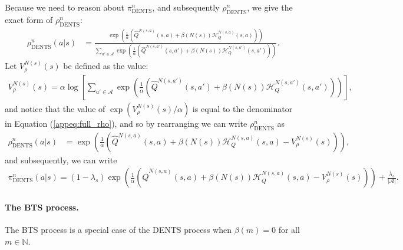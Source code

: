 \documentclass{article}
\newcommand{\bb}[1]{\mathbb{#1}}
\newcommand{\cl}[1]{\mathcal{#1}}
\newcommand{\Qt}[3]{\hat{Q}^{#3}(#1,#2)}
\theoremstyle{plain}
\begin{document}
\begin{appendices}
        Because we need to reason about $\pi^n_{\text{DENTS}}$, and subsequently $\rho^n_{\text{DENTS}}$, we give the exact form of $\rho^n_{\text{DENTS}}$:
        \begin{align}
            \rho^n_{\text{DENTS}}(a|s) &= \frac{\exp\left(\frac{1}{\alpha}\left(\Qt{s}{a}{N(s,a)} + \beta(N(s))\cl{H}_Q^{N(s,a)}(s,a) \right)\right)}{
                                \sum_{a'\in\cl{A}} \exp\left(\frac{1}{\alpha}\left(\Qt{s}{a'}{N(s,a')} + \beta(N(s))\cl{H}_Q^{N(s,a')}(s,a') \right)\right)  }.  \label{appeq:full_rho}
        \end{align}
        Let $V_\rho^{N(s)}(s)$ be defined as the value:
        \begin{align}
            V_\rho^{N(s)}(s) = \alpha \log \left[ \sum_{a'\in\cl{A}} \exp\left(\frac{1}{\alpha}\left(\Qt{s}{a'}{N(s,a')} + \beta(N(s))\cl{H}_Q^{N(s,a')}(s,a') \right)\right) \right], \label{appeq:v_rho}
        \end{align} 
        and notice that the value of $\exp(V_\rho^{N(s)}(s)/\alpha)$ is equal to the denominator in Equation (\ref{appeq:full_rho}), and so by rearranging we can write $\rho^n_{\text{DENTS}}$ as 
        \begin{align}
            \rho^n_{\text{DENTS}}(a|s) &= \exp\left(\frac{1}{\alpha}\left(\Qt{s}{a}{N(s,a)} + \beta(N(s))\cl{H}_Q^{N(s,a)}(s,a) - V_\rho^{N(s)}(s) \right)\right), \label{appeq:rho_concise}
        \end{align}
        and subsequently, we can write 
        \begin{align}
            \pi^{n}_{\text{DENTS}}(a|s) = (1-\lambda_s)\exp\left(\frac{1}{\alpha}\left(\Qt{s}{a}{N(s,a)} + \beta(N(s))\cl{H}_Q^{N(s,a)}(s,a) - V_\rho^{N(s)}(s) \right)\right) + \frac{\lambda_s}{|\cl{A}|}. \label{appeq:dents_search_policy_exact} 
        \end{align}







        \paragraph{The BTS process.}
        The BTS process is a special case of the DENTS process when $\beta(m)=0$ for all $m\in\bb{N}$.







\end{appendices}
\end{document}
